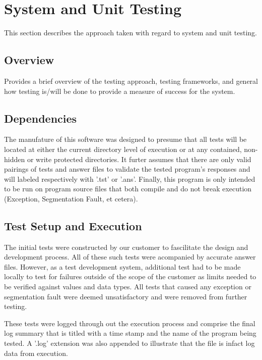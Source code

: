 
\chapter{System  and Unit Testing}

This section describes the approach taken with regard to system and unit testing. 

\section{Overview}
Provides a brief overview of the testing approach, testing frameworks, and general 
how testing is/will be done to provide a measure of success for the system. 



\section{Dependencies}
The manufature of this software was designed to presume that all tests will be located at either the current directory level of execution or at any contained, non-hidden or write protected directories.  It furter assumes that there are only valid pairings of tests and answer files to validate the tested program's responses and will labeled respectively with '.tst' or '.ans'.  Finally, this program is only intended to be run on program source files that both compile and do not break execution (Exception, Segmentation Fault, et cetera).

\section{Test Setup and Execution}
The initial tests were constructed by our customer to fascilitate the design and development process.  All of these such tests were acompanied by accurate answer files.  However, as a test development system, additional test had to be made locally to test for failures outside of the scope of the customer as limits needed to be verified against values and data types.  All tests that caused any exception or segmentation fault were deemed unsatisfactory and were removed from further testing.

These tests were logged through out the execution process and comprise the final log summary that is titled with a time stamp and the name of the program being tested.  A '.log' extension was also appended to illustrate that the file is infact log data from execution.